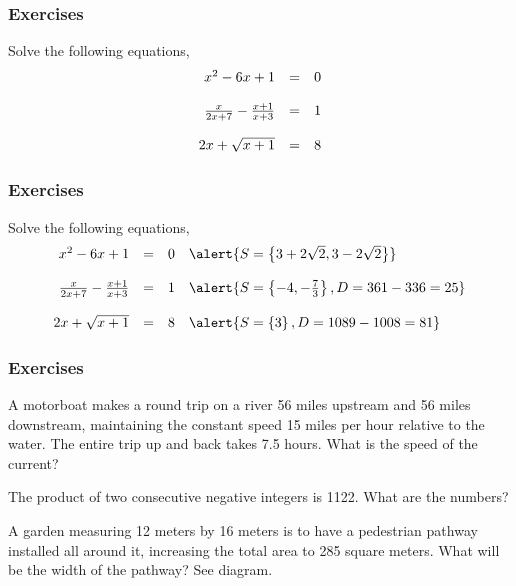 \documentclass[xcolor=dvipsnames]{beamer}
\begin{document}
\begin{frame}
  \frametitle{Exercises}
{\ubung} Solve the following equations,
\begin{equation}
  \label{eq:koaseich}
  \begin{array}{rcl}
    x^{2}-6x+1&=&0 \\
\hspace{.5in} && \\
    \frac{x}{2x+7}-\frac{x+1}{x+3}&=&1 \\
\hspace{.5in} && \\
    2x+\sqrt{x+1}&=&8 
  \end{array}
\end{equation}
\end{frame}

\begin{frame}
  \frametitle{Exercises}
  \addtocounter{exercise}{-1}
{\ubung} Solve the following equations,
\begin{equation}
  \label{eq:neeshouw}
  \begin{array}{rcll}
    x^{2}-6x+1&=&0&\alert{S=\left\{3+2\sqrt{2},3-2\sqrt{2}\right\}} \\
\hspace{.5in} && \\
    \frac{x}{2x+7}-\frac{x+1}{x+3}&=&1&\alert{S=\left\{-4,-\frac{7}{3}\right\},D=361-336=25} \\
\hspace{.5in} && \\
    2x+\sqrt{x+1}&=&8&\alert{S=\left\{3\right\},D=1089-1008=81}
  \end{array}
\end{equation}
\end{frame}

\begin{frame}
  \frametitle{Exercises}
{\ubung} A motorboat makes a round trip on a river 56 miles upstream and 56
miles downstream, maintaining the constant speed 15 miles per hour
relative to the water. The entire trip up and back takes 7.5 hours.
What is the speed of the current?

{\ubung} The product of two consecutive negative integers is 1122. What are
the numbers?

{\ubung} A garden measuring 12 meters by 16 meters is to have a pedestrian
pathway installed all around it, increasing the total area to 285
square meters. What will be the width of the pathway? See diagram.
\end{frame}
\end{document}

